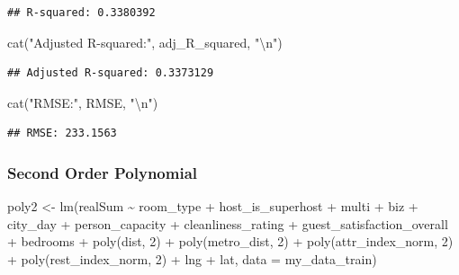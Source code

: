 \documentclass[
]{article}
\newenvironment{Shaded}{\begin{snugshade}}{\end{snugshade}}
\newcommand{\AttributeTok}[1]{\textcolor[rgb]{0.77,0.63,0.00}{#1}}
\newcommand{\DecValTok}[1]{\textcolor[rgb]{0.00,0.00,0.81}{#1}}
\newcommand{\FunctionTok}[1]{\textcolor[rgb]{0.00,0.00,0.00}{#1}}
\newcommand{\NormalTok}[1]{#1}
\newcommand{\OtherTok}[1]{\textcolor[rgb]{0.56,0.35,0.01}{#1}}
\newcommand{\SpecialCharTok}[1]{\textcolor[rgb]{0.00,0.00,0.00}{#1}}
\newcommand{\StringTok}[1]{\textcolor[rgb]{0.31,0.60,0.02}{#1}}
\begin{document}
\begin{verbatim}
## R-squared: 0.3380392
\end{verbatim}

\begin{Shaded}
\begin{Highlighting}[]
\FunctionTok{cat}\NormalTok{(}\StringTok{"Adjusted R{-}squared:"}\NormalTok{, adj\_R\_squared, }\StringTok{"}\SpecialCharTok{\textbackslash{}n}\StringTok{"}\NormalTok{)}
\end{Highlighting}
\end{Shaded}

\begin{verbatim}
## Adjusted R-squared: 0.3373129
\end{verbatim}

\begin{Shaded}
\begin{Highlighting}[]
\FunctionTok{cat}\NormalTok{(}\StringTok{"RMSE:"}\NormalTok{, RMSE, }\StringTok{"}\SpecialCharTok{\textbackslash{}n}\StringTok{"}\NormalTok{)}
\end{Highlighting}
\end{Shaded}

\begin{verbatim}
## RMSE: 233.1563
\end{verbatim}

\hypertarget{second-order-polynomial}{%
\subsubsection{Second Order Polynomial}\label{second-order-polynomial}}

\begin{Shaded}
\begin{Highlighting}[]
\NormalTok{poly2 }\OtherTok{\textless{}{-}} \FunctionTok{lm}\NormalTok{(realSum }\SpecialCharTok{\textasciitilde{}}\NormalTok{ room\_type }\SpecialCharTok{+}\NormalTok{ host\_is\_superhost }\SpecialCharTok{+}\NormalTok{ multi }\SpecialCharTok{+}
\NormalTok{    biz }\SpecialCharTok{+}\NormalTok{ city\_day }\SpecialCharTok{+}\NormalTok{ person\_capacity }\SpecialCharTok{+}\NormalTok{ cleanliness\_rating }\SpecialCharTok{+}\NormalTok{ guest\_satisfaction\_overall }\SpecialCharTok{+}
\NormalTok{    bedrooms }\SpecialCharTok{+} \FunctionTok{poly}\NormalTok{(dist, }\DecValTok{2}\NormalTok{) }\SpecialCharTok{+} \FunctionTok{poly}\NormalTok{(metro\_dist, }\DecValTok{2}\NormalTok{) }\SpecialCharTok{+} \FunctionTok{poly}\NormalTok{(attr\_index\_norm,}
    \DecValTok{2}\NormalTok{) }\SpecialCharTok{+} \FunctionTok{poly}\NormalTok{(rest\_index\_norm, }\DecValTok{2}\NormalTok{) }\SpecialCharTok{+}\NormalTok{ lng }\SpecialCharTok{+}\NormalTok{ lat, }\AttributeTok{data =}\NormalTok{ my\_data\_train)}
\end{Highlighting}
\end{Shaded}
\end{document}
